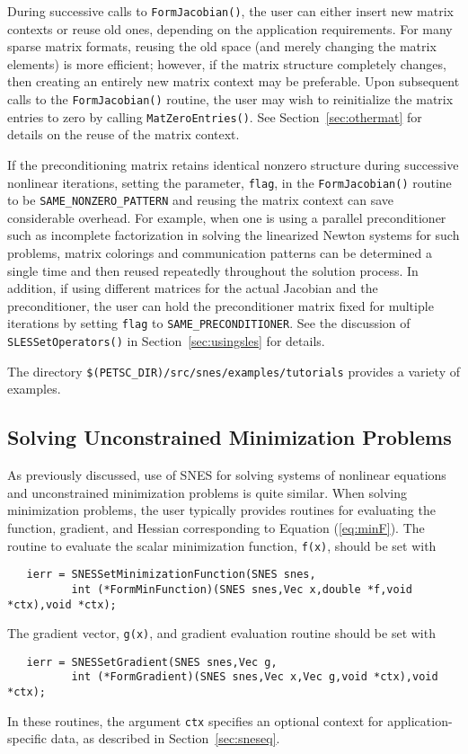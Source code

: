 During successive calls to {\tt FormJacobian()}, the user can either
insert new matrix contexts or reuse old ones, depending on the
application requirements. For many sparse matrix formats, reusing the
old space (and merely changing the matrix elements) is more efficient;
however, if the matrix structure completely changes, then creating an
entirely new matrix context may be preferable.  
Upon subsequent calls to the 
{\tt FormJacobian()} routine, the user may wish to reinitialize the matrix
entries to zero by calling {\tt MatZeroEntries()}.  See
Section~\ref{sec:othermat} for details on the reuse of the matrix
context.

If the preconditioning matrix retains identical nonzero structure
during successive nonlinear iterations, setting the parameter, {\tt flag},
in the {\tt FormJacobian()} routine to be {\tt SAME\_NONZERO\_PATTERN} 
 and reusing the matrix context can save
considerable overhead.  For example, when one is using a parallel
preconditioner such as incomplete factorization in solving the
linearized Newton systems for such problems, matrix colorings and
communication patterns can be determined a single time and then reused
repeatedly throughout the solution process.  In addition, if using
different matrices for the actual Jacobian and the preconditioner, the
user can hold the preconditioner matrix fixed for multiple iterations
by setting {\tt flag} to {\tt SAME\_PRECONDITIONER}.  See the
discussion of {\tt SLESSetOperators()} in Section~\ref{sec:usingsles} for
details.

The directory {\tt \$(PETSC\_DIR)/src/snes/examples/tutorials} provides
a variety of examples.

\subsection{Solving Unconstrained Minimization Problems}
\label{sec:sums}

As previously discussed, use of SNES for solving systems of
nonlinear equations and unconstrained minimization problems is quite
similar.  When solving minimization problems, the user typically
provides routines for evaluating the function, gradient, and Hessian
corresponding to Equation (\ref{eq:minF}).  The routine to evaluate
the scalar minimization function, {\tt f(x)}, should be set with
\begin{verbatim}
   ierr = SNESSetMinimizationFunction(SNES snes,
          int (*FormMinFunction)(SNES snes,Vec x,double *f,void *ctx),void *ctx);
\end{verbatim}
The gradient vector, {\tt g(x)}, and gradient evaluation routine should
be set with 
\begin{verbatim}
   ierr = SNESSetGradient(SNES snes,Vec g,
          int (*FormGradient)(SNES snes,Vec x,Vec g,void *ctx),void *ctx);
\end{verbatim}
In these routines, the argument {\tt ctx} specifies an 
optional context for application-specific data, as described in 
Section~\ref{sec:sneseq}.

